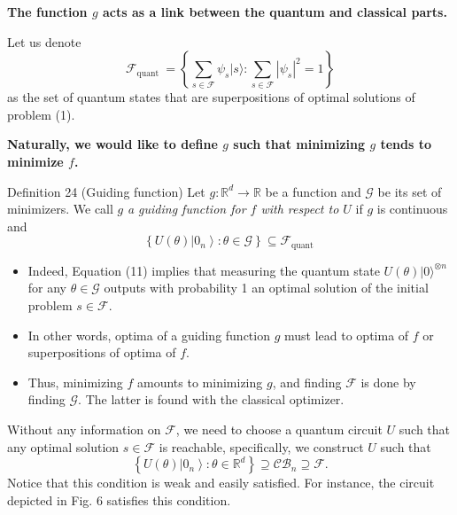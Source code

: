 \textbf{The function $g$ acts as a link between the quantum and classical parts. }


Let us denote 
$$
\mathcal{F}_{\text {quant }}=\left\{\sum_{s \in \mathcal{F}} \psi_{s}|s\rangle: \sum_{s \in \mathcal{F}}\left|\psi_{s}\right|^{2}=1\right\}
$$
as the set of quantum states that are superpositions of optimal solutions of problem (1). %

\textbf{Naturally, we would like to define $g$ such that minimizing $g$ tends to minimize $f$.}

\begin{definition}
    Definition 24 (Guiding function) Let $g: \mathbb{R}^{d} \rightarrow \mathbb{R}$ be a function and $\mathcal{G}$ be its set of minimizers. We call $g$ \textit{a guiding function for $f$ with respect to $U$} if $g$ is continuous and
\begin{equation*}
\left\{U(\theta)\left|0_{n}\right\rangle: \theta \in \mathcal{G}\right\} \subseteq \mathcal{F}_{\text {quant }} \tag{11}
\end{equation*}
\end{definition}

\begin{itemize}
    \item Indeed, Equation (11) implies that measuring the quantum state $U\left(\theta\right)|0\rangle^{\otimes n}$ for any $\theta\in \mathcal{G}$ outputs with probability 1 an optimal solution of the initial problem $s \in \mathcal{F}$.
    \item In other words, optima of a guiding function $g$ must lead to optima of $f$ or superpositions of optima of $f$.
    \item Thus, minimizing $f$ amounts to minimizing $g$, and finding $\mathcal{F}$ is done by finding $\mathcal{G}$. The latter is found with the classical optimizer.
\end{itemize}


\begin{remark}
    Without any information on $\mathcal{F}$, we need to choose a quantum circuit $U$ such that any optimal solution $s \in \mathcal{F}$ is reachable, specifically, we construct $U$ such that
\begin{equation*}
\left\{U(\theta)\left|0_{n}\right\rangle: \theta \in \mathbb{R}^{d}\right\} \supseteq \mathcal{C} \mathcal{B}_{n} \supseteq \mathcal{F}. \tag{12}
\end{equation*}
Notice that this condition is weak and easily satisfied. For instance, the circuit depicted in Fig. 6 satisfies this condition. %
\end{remark}

